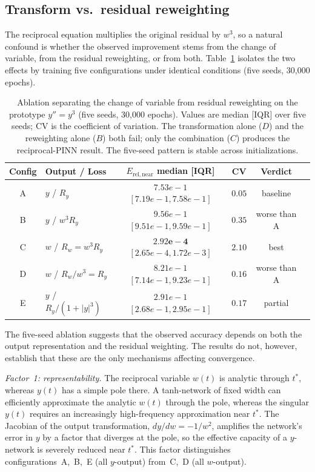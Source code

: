 \documentclass[11pt,a4paper]{article}
\theoremstyle{definition}
\begin{document}
\subsection{Transform vs.\ residual reweighting}
\label{sec:M1}

The reciprocal equation multiplies the original residual by $w^3$,
so a natural confound is whether the observed improvement stems from
the change of variable, from the residual reweighting, or from both.
Table~\ref{tab:M1} isolates the two effects by training five
configurations under identical conditions (five seeds, 30{,}000 epochs).

\begin{table}[t]
\centering
\caption{Ablation separating the change of variable from residual reweighting
on the prototype $y''=y^3$ (five seeds, 30{,}000 epochs).
Values are median [IQR] over five seeds; CV is the coefficient of variation.
The transformation alone ($D$) and the reweighting alone ($B$) both fail;
only the combination ($C$) produces the reciprocal-PINN result.
The five-seed pattern is stable across initializations.}
\label{tab:M1}
\begin{tabular}{clcccc}
\toprule
Config & Output / Loss & $E_{\mathrm{rel,near}}$ median [IQR] & CV & Verdict \\
\midrule
A & $y$ / $R_y$ & $7.53e-1$ $[7.19e-1, 7.58e-1]$ & $0.05$ & baseline \\
B & $y$ / $w^3 R_y$ & $9.56e-1$ $[9.51e-1, 9.59e-1]$ & $0.35$ & worse than A \\
C & $w$ / $R_w = w^3 R_y$ & $\mathbf{2.92e-4}$ $[2.65e-4, 1.72e-3]$ & $2.10$ & best \\
D & $w$ / $R_w/w^3 = R_y$ & $8.21e-1$ $[7.14e-1, 9.23e-1]$ & $0.16$ & worse than A \\
E & $y$ / $R_y/(1+|y|^3)$ & $2.91e-1$ $[2.68e-1, 2.95e-1]$ & $0.17$ & partial \\
\bottomrule
\end{tabular}
\end{table}

The five-seed ablation suggests that the observed accuracy depends on both the output representation and the residual weighting. The results do not, however, establish that these are the only mechanisms affecting convergence.

\emph{Factor~1: representability.} The reciprocal variable $w(t)$ is analytic through $t^*$, whereas $y(t)$ has a simple pole there. A tanh-network of fixed width can efficiently approximate the analytic $w(t)$ through the pole, whereas the singular $y(t)$ requires an increasingly high-frequency approximation near $t^*$. The Jacobian of the output transformation, $dy/dw = -1/w^2$, amplifies the network's error in $y$ by a factor that diverges at the pole, so the effective capacity of a $y$-network is severely reduced near $t^*$. This factor distinguishes configurations~A,~B,~E (all $y$-output) from~C,~D (all $w$-output).
\end{document}
